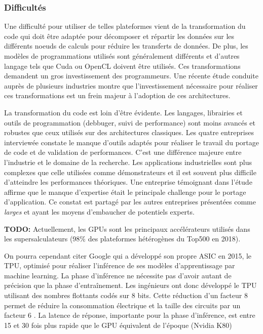     
    \subsubsection{Difficultés}
    
        Une difficulté pour utiliser de telles plateformes vient de la transformation du code qui doit être adaptée pour décomposer et répartir les données sur les différents noeuds de calculs pour réduire les transferts de données. De plus, les modèles de programmations utilisés sont généralement différents et d'autres langage tels que Cuda ou OpenCL doivent être utilisés. Ces transformations demandent un gros investissement des programmeurs. Une récente étude \cite{inproceedingsSCHC} conduite auprès de plusieurs industries montre que l'investissement nécessaire pour réaliser ces transformations est un frein majeur à l'adoption de ces architectures.
        
        La transformation du code est loin d'être évidente. Les langages, librairies et outils de programmation (debbuger, suivi de performance) sont moins avancés et robustes que ceux utilisés sur des architectures classiques. Les quatre entreprises interviewée constate le manque d'outils adaptés pour réaliser le travail du portage de code et de validation de performances. C'est une différence majeure entre l'industrie et le domaine de la recherche. Les applications industrielles sont plus complexes que celle utilisées comme démonstrateurs et il est souvent plus difficile d'atteindre les performances théoriques. Une entreprise témoignant dans l'étude \cite{inproceedingsSCHC} affirme que le manque d'expertise était le principale challenge pour le portage d'application. Ce constat est partagé par les autres entreprises présentées comme \textit{larges} et ayant les moyens d'embaucher de potentiels experts. 
        
        
        \textbf{TODO: }
        Actuellement, les GPUs sont les principaux accélérateurs utilisés dans les supersalculateurs (98\% des plateformes hétérogènes du Top500 en 2018). 
        
        
        On pourra cependant citer Google qui a développé son propre ASIC en 2015, le TPU, optimisé pour réaliser l'inférence de ses modèles d'apprentissage par machine learning. La phase d'inférence ne nécessite pas d'avoir autant de précision que la phase d'entraînement. Les ingénieurs ont donc développé le TPU utilisant des nombres flottants codés sur 8 bits. Cette réduction d'un facteur 8 permet de réduire la consommation électrique et la taille des circuits par un facteur 6 \cite{Jouppi2017}. La latence de réponse, importante pour la phase d'inférence, est entre 15 et 30 fois plus rapide que le GPU équivalent de l'époque (Nvidia K80)